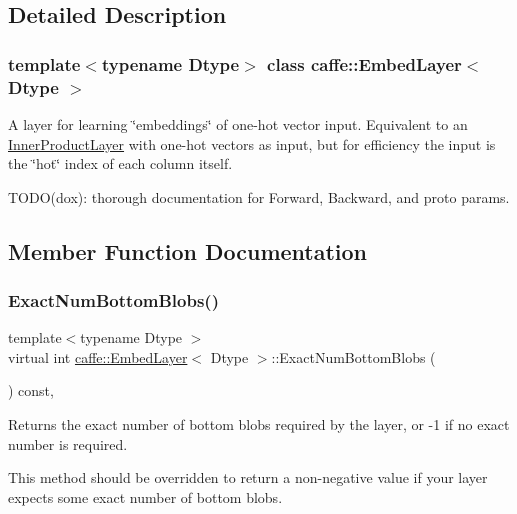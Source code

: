 \subsection{Detailed Description}
\subsubsection*{template$<$typename Dtype$>$\newline
class caffe\+::\+Embed\+Layer$<$ Dtype $>$}

A layer for learning \char`\"{}embeddings\char`\"{} of one-\/hot vector input. Equivalent to an \mbox{\hyperlink{classcaffe_1_1_inner_product_layer}{Inner\+Product\+Layer}} with one-\/hot vectors as input, but for efficiency the input is the \char`\"{}hot\char`\"{} index of each column itself. 

T\+O\+D\+O(dox)\+: thorough documentation for Forward, Backward, and proto params. 

\subsection{Member Function Documentation}
\mbox{\label{classcaffe_1_1_embed_layer_a0634500a12e1d2299b7c8556976e4529}} 
\subsubsection{\texorpdfstring{Exact\+Num\+Bottom\+Blobs()}{ExactNumBottomBlobs()}\hspace{0.1cm}{\footnotesize\ttfamily [1/2]}}
{\footnotesize\ttfamily template$<$typename Dtype $>$ \\
virtual int \mbox{\hyperlink{classcaffe_1_1_embed_layer}{caffe\+::\+Embed\+Layer}}$<$ Dtype $>$\+::Exact\+Num\+Bottom\+Blobs (\begin{DoxyParamCaption}{ }\end{DoxyParamCaption}) const\hspace{0.3cm}{\ttfamily [inline]}, {\ttfamily [virtual]}}



Returns the exact number of bottom blobs required by the layer, or -\/1 if no exact number is required. 

This method should be overridden to return a non-\/negative value if your layer expects some exact number of bottom blobs. 

